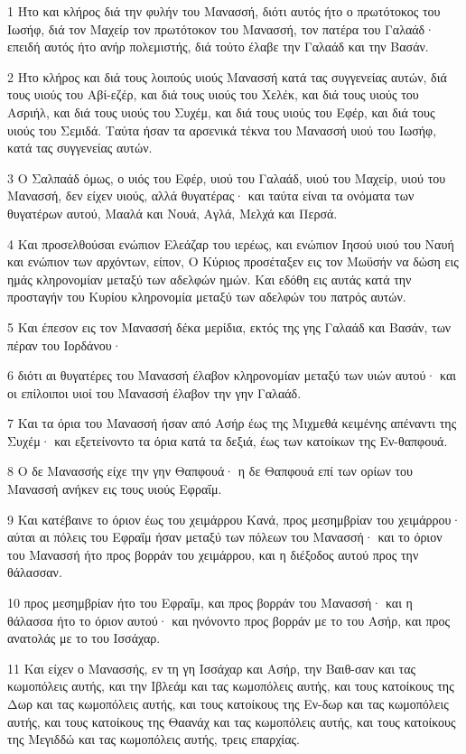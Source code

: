 \par 1 Ήτο και κλήρος διά την φυλήν του Μανασσή, διότι αυτός ήτο ο πρωτότοκος του Ιωσήφ, διά τον Μαχείρ τον πρωτότοκον του Μανασσή, τον πατέρα του Γαλαάδ· επειδή αυτός ήτο ανήρ πολεμιστής, διά τούτο έλαβε την Γαλαάδ και την Βασάν.
\par 2 Ήτο κλήρος και διά τους λοιπούς υιούς Μανασσή κατά τας συγγενείας αυτών, διά τους υιούς του Αβί-εζέρ, και διά τους υιούς του Χελέκ, και διά τους υιούς του Ασριήλ, και διά τους υιούς του Συχέμ, και διά τους υιούς του Εφέρ, και διά τους υιούς του Σεμιδά. Ταύτα ήσαν τα αρσενικά τέκνα του Μανασσή υιού του Ιωσήφ, κατά τας συγγενείας αυτών.
\par 3 Ο Σαλπαάδ όμως, ο υιός του Εφέρ, υιού του Γαλαάδ, υιού του Μαχείρ, υιού του Μανασσή, δεν είχεν υιούς, αλλά θυγατέρας· και ταύτα είναι τα ονόματα των θυγατέρων αυτού, Μααλά και Νουά, Αγλά, Μελχά και Περσά.
\par 4 Και προσελθούσαι ενώπιον Ελεάζαρ του ιερέως, και ενώπιον Ιησού υιού του Ναυή και ενώπιον των αρχόντων, είπον, Ο Κύριος προσέταξεν εις τον Μωϋσήν να δώση εις ημάς κληρονομίαν μεταξύ των αδελφών ημών. Και εδόθη εις αυτάς κατά την προσταγήν του Κυρίου κληρονομία μεταξύ των αδελφών του πατρός αυτών.
\par 5 Και έπεσον εις τον Μανασσή δέκα μερίδια, εκτός της γης Γαλαάδ και Βασάν, των πέραν του Ιορδάνου·
\par 6 διότι αι θυγατέρες του Μανασσή έλαβον κληρονομίαν μεταξύ των υιών αυτού· και οι επίλοιποι υιοί του Μανασσή έλαβον την γην Γαλαάδ.
\par 7 Και τα όρια του Μανασσή ήσαν από Ασήρ έως της Μιχμεθά κειμένης απέναντι της Συχέμ· και εξετείνοντο τα όρια κατά τα δεξιά, έως των κατοίκων της Εν-θαπφουά.
\par 8 Ο δε Μανασσής είχε την γην Θαπφουά· η δε Θαπφουά επί των ορίων του Μανασσή ανήκεν εις τους υιούς Εφραΐμ.
\par 9 Και κατέβαινε το όριον έως του χειμάρρου Κανά, προς μεσημβρίαν του χειμάρρου· αύται αι πόλεις του Εφραΐμ ήσαν μεταξύ των πόλεων του Μανασσή· και το όριον του Μανασσή ήτο προς βορράν του χειμάρρου, και η διέξοδος αυτού προς την θάλασσαν.
\par 10 προς μεσημβρίαν ήτο του Εφραΐμ, και προς βορράν του Μανασσή· και η θάλασσα ήτο το όριον αυτού· και ηνόνοντο προς βορράν με το του Ασήρ, και προς ανατολάς με το του Ισσάχαρ.
\par 11 Και είχεν ο Μανασσής, εν τη γη Ισσάχαρ και Ασήρ, την Βαιθ-σαν και τας κωμοπόλεις αυτής, και την Ιβλεάμ και τας κωμοπόλεις αυτής, και τους κατοίκους της Δωρ και τας κωμοπόλεις αυτής, και τους κατοίκους της Εν-δωρ και τας κωμοπόλεις αυτής, και τους κατοίκους της Θαανάχ και τας κωμοπόλεις αυτής, και τους κατοίκους της Μεγιδδώ και τας κωμοπόλεις αυτής, τρεις επαρχίας.

